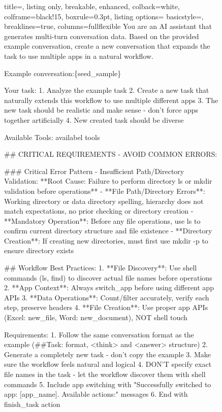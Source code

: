 \begin{figure}[htbp]
    \centering
\begin{tcolorbox}[title=Prompt to synthesize OfficeBench]
\begin{tcblisting}{
  title=,
  listing only,
  breakable,
  enhanced,
  colback=white,
  colframe=black!15,
  boxrule=0.3pt,
  listing options={
    basicstyle=\ttfamily\scriptsize, %
    breaklines=true,
    columns=fullflexible
  }
}
You are an AI assistant that generates multi-turn conversation data. Based on the provided example conversation, create a new conversation that expands the task to use multiple apps in a natural workflow.

Example conversation:\{seed\_sample\}

Your task:
1. Analyze the example task
2. Create a new task that naturally extends this workflow to use multiple different apps
3. The new task should be realistic and make sense - don't force apps together artificially
4. New created task should be diverse 

Available Tools:
{availabel tools}

## CRITICAL REQUIREMENTS - AVOID COMMON ERRORS:

### Critical Error Pattern - Insufficient Path/Directory Validation:
**Root Cause: Failure to perform directory ls or mkdir validation before operations**
- **File Path/Directory Errors**: Working directory or data directory spelling, hierarchy does not match expectations, no prior checking or directory creation
- **Mandatory Operation**: Before any file operations, use ls to confirm current directory structure and file existence
- **Directory Creation**: If creating new directories, must first use mkdir -p to ensure directory exists

## Workflow Best Practices:
1. **File Discovery**: Use shell commands (ls, find) to discover actual file names before operations
2. **App Context**: Always switch\_app before using different app APIs
3. **Data Operations**: Count/filter accurately, verify each step, preserve headers
4. **File Creation**: Use proper app APIs (Excel: new_file, Word: new_document), NOT shell touch

Requirements:
1. Follow the same conversation format as the example (\#\#Task: format, <think> and <answer> structure)
2. Generate a completely new task - don't copy the example
3. Make sure the workflow feels natural and logical
4. DON'T specify exact file names in the task - let the workflow discover them with shell commands
5. Include app switching with "Successfully switched to app: [app\_name]. Available actions:" messages
6. End with finish\_task action


\end{tcblisting}
\end{tcolorbox}
\end{figure}
